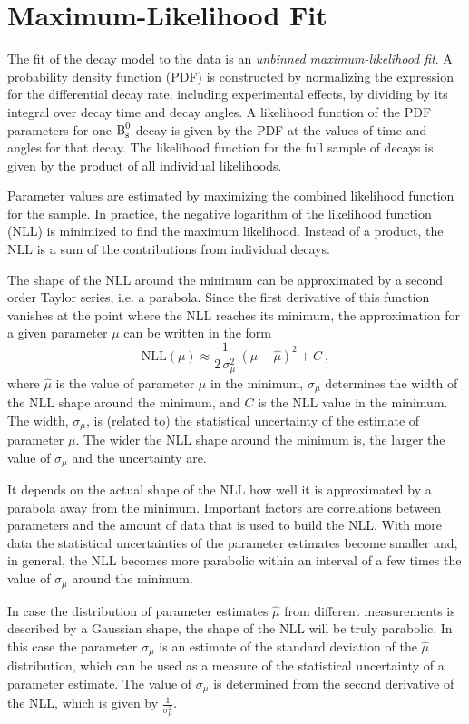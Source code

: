 \section{Maximum-Likelihood Fit}
\label{sec:ana_fit}

The fit of the decay model to the data is an \emph{unbinned maximum-likelihood fit}. A probability density function (PDF) is constructed by
normalizing the expression for the differential decay rate, including experimental effects, by dividing by its integral over decay time and
decay angles. A likelihood function of the PDF parameters for one $\text{B}_\text{s}^\text{0}$ decay is given by the PDF at the values of time and angles for
that decay. The likelihood function for the full sample of decays is given by the product of all individual likelihoods.

Parameter values are estimated by maximizing the combined likelihood function for the sample. In practice, the negative logarithm of the
likelihood function (NLL) is minimized to find the maximum likelihood. Instead of a product, the NLL is a sum of the contributions from
individual decays.

The shape of the NLL around the minimum can be approximated by a second order Taylor series, i.e. a parabola. Since the first derivative of
this function vanishes at the point where the NLL reaches its minimum, the approximation for a given parameter $\mu$ can be written in the
form
\begin{equation}
  \label{eq:NLLPara}
  \text{NLL}(\mu) \approx \frac{1}{2\,\sigma_\mu^2}\, (\mu-\hat{\mu})^2 + C \ ,
\end{equation}
where $\hat{\mu}$ is the value of parameter $\mu$ in the minimum, $\sigma_\mu$ determines the width of the NLL shape around the minimum,
and $C$ is the NLL value in the minimum. The width, $\sigma_\mu$, is (related to) the statistical uncertainty of the estimate of parameter
$\mu$. The wider the NLL shape around the minimum is, the larger the value of $\sigma_\mu$ and the uncertainty are.

It depends on the actual shape of the NLL how well it is approximated by a parabola away from the minimum. Important factors are
correlations between parameters and the amount of data that is used to build the NLL. With more data the statistical uncertainties of
the parameter estimates become smaller and, in general, the NLL becomes more parabolic within an interval of a few times the value of
$\sigma_\mu$ around the minimum.

In case the distribution of parameter estimates $\hat{\mu}$ from different measurements is described by a Gaussian shape, the shape of the
NLL will be truly parabolic. In this case the parameter $\sigma_\mu$ is an estimate of the standard deviation of the $\hat{\mu}$
distribution, which can be used as a measure of the statistical uncertainty of a parameter estimate. The value of $\sigma_\mu$ is
determined from the second derivative of the NLL, which is given by $\frac{1}{\sigma_\mu^2}$.

